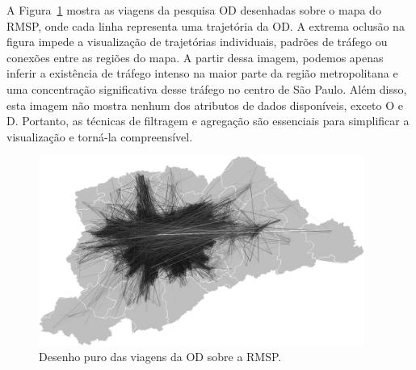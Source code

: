 A Figura~\ref{fig:cluttered-graph} mostra as viagens da pesquisa OD desenhadas sobre o mapa do
RMSP, onde cada linha representa uma trajetória da OD. A extrema oclusão na figura
impede a visualização de trajetórias individuais, padrões de tráfego ou conexões
entre as regiões do mapa. A partir dessa imagem, podemos apenas inferir a
existência de tráfego intenso na maior parte da região metropolitana e uma
concentração significativa desse tráfego no centro de São Paulo. Além disso,
esta imagem não mostra nenhum dos atributos de dados disponíveis, exceto O e D.
Portanto, as técnicas de filtragem e agregação são essenciais para simplificar a
visualização e torná-la compreensível.

\begin{figure}[!htb]
  \centering
  \captionsetup{justification=centering}
  \includegraphics[width=0.95\textwidth]{figuras/unbundled-edges+grayscale+512px.png}
  \caption{Desenho puro das viagens da OD sobre a RMSP.\label{fig:cluttered-graph}}
\end{figure}